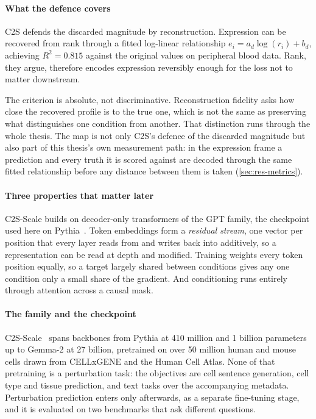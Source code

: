 \paragraph{What the defence covers} C2S defends the discarded magnitude by
reconstruction. Expression can be recovered from rank through a fitted
log-linear relationship $e_i = a_d\log(r_i) + b_d$, achieving $R^2 = 0.815$
against the original values on peripheral blood data. Rank, they argue,
therefore encodes expression reversibly enough for the loss not to matter
downstream.

The criterion is absolute, not discriminative. Reconstruction fidelity asks how
close the recovered profile is to the true one, which is not the same as
preserving what distinguishes one condition from another. That distinction runs
through the whole thesis. The map is not only C2S's defence of the discarded
magnitude but also part of this thesis's own measurement path: in the expression
frame a prediction and every truth it is scored against are decoded through the
same fitted relationship before any distance between them is taken
(\cref{sec:res-metrics}).

\paragraph{Three properties that matter later}
C2S-Scale builds on decoder-only transformers of the GPT family, the checkpoint
used here on Pythia~\cite{pythia}. Token embeddings form a \emph{residual
stream}, one vector per position that every layer reads from and writes back into
additively, so a representation can be read at depth and
modified. Training weights every token position equally, so a target largely
shared between conditions gives any one condition only a small share of the
gradient. And conditioning runs entirely through attention across a causal mask.

\paragraph{The family and the checkpoint}
C2S-Scale~\cite{c2sscale} spans backbones from Pythia at 410 million and 1
billion parameters up to Gemma-2 at 27 billion, pretrained on over 50 million
human and mouse cells drawn from CELLxGENE and the Human Cell Atlas. None of
that pretraining is a perturbation task: the objectives are cell sentence
generation, cell type and tissue prediction, and text tasks over the
accompanying metadata. Perturbation prediction enters only afterwards, as a
separate fine-tuning stage, and it is evaluated on two benchmarks that ask
different questions.


